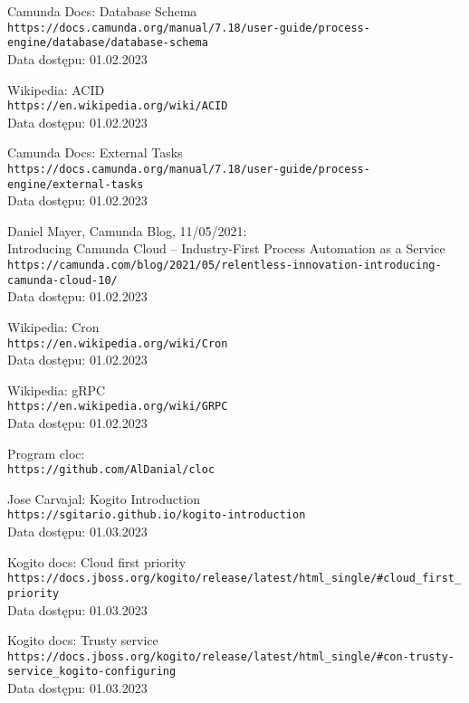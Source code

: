 \documentclass[declaration,shortabstract,mgr]{iithesis}
\begin{document}
\begin{thebibliography}{1}
Camunda Docs: Database Schema \\
\texttt{https://docs.camunda.org/manual/7.18/user-guide/process-engine/database/database-schema} \\
Data dostępu: 01.02.2023

Wikipedia: ACID \\
\texttt{https://en.wikipedia.org/wiki/ACID} \\
Data dostępu: 01.02.2023

Camunda Docs: External Tasks \\
\texttt{https://docs.camunda.org/manual/7.18/user-guide/process-engine/external-tasks} \\
Data dostępu: 01.02.2023

Daniel Mayer, Camunda Blog, 11/05/2021: \\
Introducing Camunda Cloud -- Industry-First Process Automation as a Service \\
\texttt{https://camunda.com/blog/2021/05/relentless-innovation-introducing-camunda-cloud-10/} \\
Data dostępu: 01.02.2023

Wikipedia: Cron \\
\texttt{https://en.wikipedia.org/wiki/Cron} \\
Data dostępu: 01.02.2023

Wikipedia: gRPC \\
\texttt{https://en.wikipedia.org/wiki/GRPC} \\
Data dostępu: 01.02.2023


Program cloc: \\
\texttt{https://github.com/AlDanial/cloc}

Jose Carvajal: Kogito Introduction \\
\texttt{https://sgitario.github.io/kogito-introduction} \\
Data dostępu: 01.03.2023

Kogito docs: Cloud first priority \\
\texttt{https://docs.jboss.org/kogito/release/latest/html\_single/\#cloud\_first\_priority} \\
Data dostępu: 01.03.2023

Kogito docs: Trusty service \\
\texttt{https://docs.jboss.org/kogito/release/latest/html\_single/\#con-trusty-service\_kogito-configuring} \\
Data dostępu: 01.03.2023


\end{thebibliography}
\end{document}
